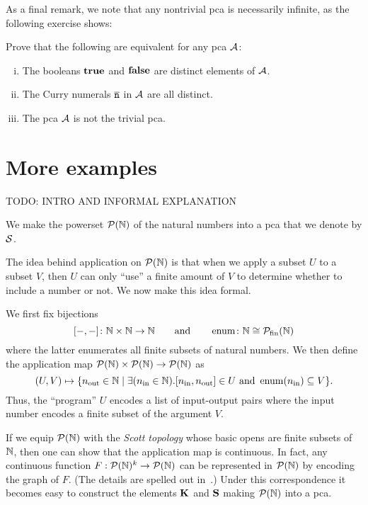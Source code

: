 As a final remark, we note that any nontrivial pca is necessarily infinite, as
the following exercise shows:
\begin{exercise}
  Prove that the following are equivalent for any pca \(\AA\):
  \begin{enumerate}[(i)]
  \item The booleans \(\pcatrue\) and \(\pcafalse\) are distinct elements of
    \(\AA\).
  \item The Curry numerals \(\numeral{n}\) in \(\AA\) are all distinct.
  \item The pca \(\AA\) is not the trivial pca.
  \end{enumerate}
\end{exercise}

\section{More examples}

\textcolor{Mulberry}{TODO: INTRO AND INFORMAL EXPLANATION}
\cite{Scott1976}
\begin{example}
  We make the powerset \(\PN\) of the natural numbers into a pca that we denote
  by \(\Scott\).

  The idea behind application on \(\PN\) is that when we apply a subset \(U\) to
  a subset \(V\), then \(U\) can only ``use'' a finite amount of \(V\) to
  determine whether to include a number or not. We now make this idea formal.

  We first fix bijections
  \[
    \pairing{{-},{-}} \colon \Nat \times \Nat \to \Nat
    \quad\quad\text{and}\quad\quad
    \enum \colon \Nat \cong \powerset_{\operatorname{fin}}(\Nat)
  \]
  where the latter enumerates all finite subsets of natural numbers.
  We then define the application map \(\PN \times \PN \to \PN\) as
  \[
    (U,V) \mapsto \set{\outputnum \in \Nat \mid
            \exists(\inputnum \in \Nat) .
            \pairing{\inputnum,\outputnum} \in U \text{ and } \enum(\inputnum) \subseteq V}.
  \]
  Thus, the ``program'' \(U\) encodes a list of input-output pairs where the
  input number encodes a finite subset of the argument \(V\).

  If we equip \(\PN\) with the \emph{Scott topology} whose basic opens are
  finite subsets of \(\Nat\), then one can show that the application map is
  continuous.
  In fact, any continuous function \(F : \PN^k \to \PN\) can be represented in
  \(\PN\) by encoding the graph of \(F\).
  (The details are spelled out in~\cite[Example~2.3.4]{deJong2018}.)
  Under this correspondence it becomes easy to construct the elements \(\kcomb\)
  and \(\scomb\) making \(\PN\) into a pca.
\end{example}



